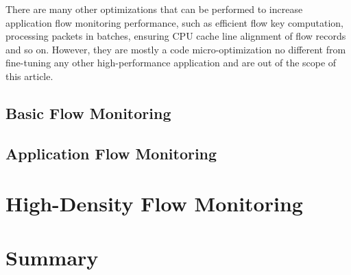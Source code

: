 There are many other optimizations that can be performed to increase application flow monitoring performance, such as efficient flow key computation, processing packets in batches, ensuring CPU cache line alignment of flow records and so on. However, they are mostly a code micro-optimization no different from fine-tuning any other high-performance application and are out of the scope of this article.

\subsection{Basic Flow Monitoring}

\subsection{Application Flow Monitoring}




\section{High-Density Flow Monitoring}

\section{Summary}\label{sec:perf-summary}